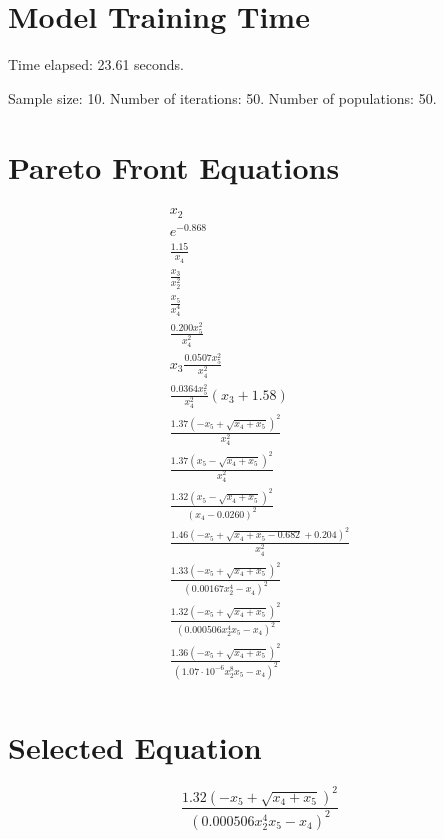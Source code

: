 \documentclass{article}
\begin{document}
\section*{Model Training Time}
Time elapsed: 23.61 seconds.

Sample size: 10.
Number of iterations: 50.
Number of populations: 50.

\section*{Pareto Front Equations}
\begin{align*}
x_{2} \\
e^{-0.868} \\
\frac{1.15}{x_{4}} \\
\frac{x_{3}}{x_{2}^{2}} \\
\frac{x_{5}}{x_{4}^{4}} \\
\frac{0.200 x_{5}^{2}}{x_{4}^{2}} \\
x_{3} \frac{0.0507 x_{5}^{2}}{x_{4}^{2}} \\
\frac{0.0364 x_{5}^{2}}{x_{4}^{2}} \left(x_{3} + 1.58\right) \\
\frac{1.37 \left(- x_{5} + \sqrt{x_{4} + x_{5}}\right)^{2}}{x_{4}^{2}} \\
\frac{1.37 \left(x_{5} - \sqrt{x_{4} + x_{5}}\right)^{2}}{x_{4}^{2}} \\
\frac{1.32 \left(x_{5} - \sqrt{x_{4} + x_{5}}\right)^{2}}{\left(x_{4} - 0.0260\right)^{2}} \\
\frac{1.46 \left(- x_{5} + \sqrt{x_{4} + x_{5} - 0.682} + 0.204\right)^{2}}{x_{4}^{2}} \\
\frac{1.33 \left(- x_{5} + \sqrt{x_{4} + x_{5}}\right)^{2}}{\left(0.00167 x_{2}^{4} - x_{4}\right)^{2}} \\
\frac{1.32 \left(- x_{5} + \sqrt{x_{4} + x_{5}}\right)^{2}}{\left(0.000506 x_{2}^{4} x_{5} - x_{4}\right)^{2}} \\
\frac{1.36 \left(- x_{5} + \sqrt{x_{4} + x_{5}}\right)^{2}}{\left(1.07 \cdot 10^{-6} x_{2}^{8} x_{5} - x_{4}\right)^{2}} \\
\end{align*}

\section*{Selected Equation}
\[ \frac{1.32 \left(- x_{5} + \sqrt{x_{4} + x_{5}}\right)^{2}}{\left(0.000506 x_{2}^{4} x_{5} - x_{4}\right)^{2}} \]
\end{document}
